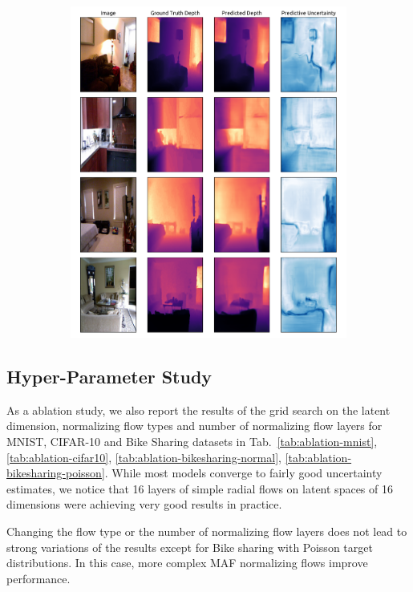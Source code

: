 \begin{figure}[ht!]
\begin{subfigure}[t]{.5\textwidth}
        \includegraphics[width=1\textwidth]{sections/007_iclr2022/resources/appendix/nyu-84-new-ii.pdf}
    \end{subfigure}%
\end{figure}


\subsection{Hyper-Parameter Study}
\label{sec:ablation-study_007}

As a ablation study, we also report the results of the grid search on the latent dimension, normalizing flow types and number of normalizing flow layers for MNIST, CIFAR-10 and Bike Sharing datasets in Tab.~\ref{tab:ablation-mnist}, \ref{tab:ablation-cifar10}, \ref{tab:ablation-bikesharing-normal}, \ref{tab:ablation-bikesharing-poisson}. While most models converge to fairly good uncertainty estimates, we notice that 16 layers of simple radial flows on latent spaces of 16 dimensions were achieving very good results in practice. 

Changing the flow type or the number of normalizing flow layers does not lead to strong variations of the results except for Bike sharing with Poisson target distributions. In this case, more complex MAF normalizing flows improve \NatPNacro{} performance. 

